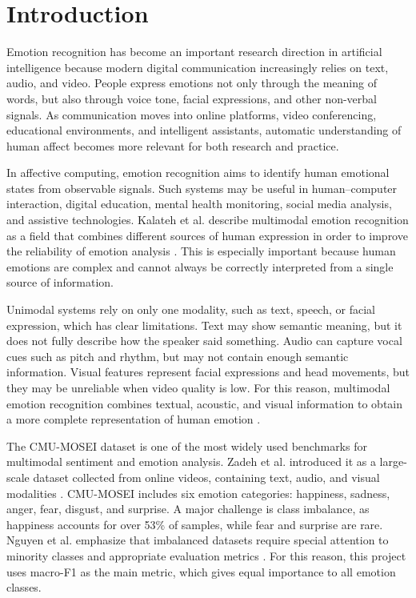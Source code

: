 
\chapter{Introduction}
\label{chap:introduction}

\setlength{\parskip}{1em}

Emotion recognition has become an important research direction in artificial intelligence because modern digital communication increasingly relies on text, audio, and video. People express emotions not only through the meaning of words, but also through voice tone, facial expressions, and other non-verbal signals. As communication moves into online platforms, video conferencing, educational environments, and intelligent assistants, automatic understanding of human affect becomes more relevant for both research and practice.

In affective computing, emotion recognition aims to identify human emotional states from observable signals. Such systems may be useful in human--computer interaction, digital education, mental health monitoring, social media analysis, and assistive technologies. Kalateh et al. describe multimodal emotion recognition as a field that combines different sources of human expression in order to improve the reliability of emotion analysis \cite{kalateh2024systematic}. This is especially important because human emotions are complex and cannot always be correctly interpreted from a single source of information.

Unimodal systems rely on only one modality, such as text, speech, or facial expression, which has clear limitations. Text may show semantic meaning, but it does not fully describe how the speaker said something. Audio can capture vocal cues such as pitch and rhythm, but may not contain enough semantic information. Visual features represent facial expressions and head movements, but they may be unreliable when video quality is low. For this reason, multimodal emotion recognition combines textual, acoustic, and visual information to obtain a more complete representation of human emotion \cite{koromilas2021deep}.

The CMU-MOSEI dataset is one of the most widely used benchmarks for multimodal sentiment and emotion analysis. Zadeh et al. introduced it as a large-scale dataset collected from online videos, containing text, audio, and visual modalities \cite{zadeh2018multimodal}. CMU-MOSEI includes six emotion categories: happiness, sadness, anger, fear, disgust, and surprise. A major challenge is class imbalance, as happiness accounts for over 53\% of samples, while fear and surprise are rare. Nguyen et al. emphasize that imbalanced datasets require special attention to minority classes and appropriate evaluation metrics \cite{nguyen2025enhanced}. For this reason, this project uses macro-F1 as the main metric, which gives equal importance to all emotion classes.

